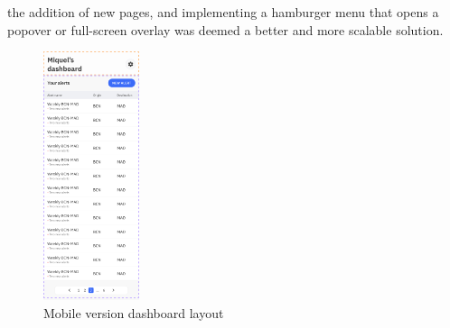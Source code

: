 \documentclass[./memory.tex]{subfiles}
\begin{document}
the addition of new pages, and implementing a hamburger menu that opens a
popover or full-screen overlay was deemed a better and more scalable solution.
\begin{figure}[H]
	\centering
	\includegraphics[width=0.25\textwidth]{./assets/designs/dashboard-layout-sm.png}
	\caption{Mobile version dashboard layout}
\end{figure}
\end{document}
